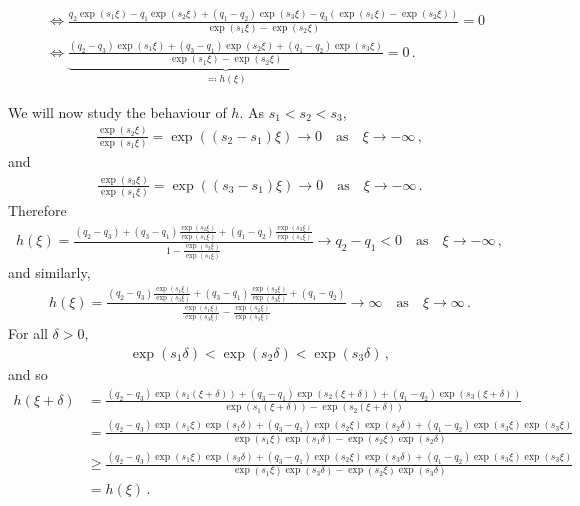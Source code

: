 %
\begin{align*}
&\iff \frac{q_2 \exp(s_1 \xi) - q_1 \exp(s_2 \xi) + (q_1 - q_2) \exp(s_3 \xi)
	- q_3 (\exp(s_1 \xi) - \exp(s_2 \xi))}{\exp(s_1 \xi) - \exp(s_2 \xi)}=0\\
&\iff \underbrace{\frac{(q_2 - q_3) \exp(s_1 \xi) + (q_3 - q_1) \exp(s_2 \xi)
		+ (q_1 - q_2) \exp(s_3 \xi)}{\exp(s_1 \xi) - \exp(s_2 \xi)}}
_{\eqqcolon h(\xi)} = 0 \,.
\end{align*}
%

%
We will now study the behaviour of $h$.
As $s_1 < s_2 < s_3$,
%
\begin{align*}
\frac{\exp(s_2 \xi)}{\exp(s_1 \xi)} = \exp((s_2 - s_1) \xi) \to 0
\quad \text{as} \quad \xi \to -\infty \,,
\end{align*}
%
and
%
\begin{align*}
\frac{\exp(s_3 \xi)}{\exp(s_1 \xi)} = \exp((s_3 - s_1) \xi) \to 0
\quad \text{as} \quad \xi \to -\infty \,.
\end{align*}
%
Therefore
%
\begin{align*}
h(\xi) = \frac{(q_2 - q_3) + (q_3 - q_1)
	\frac{\exp(s_2 \xi)}{\exp(s_1 \xi)}
	+ (q_1 - q_2)\frac{\exp(s_3 \xi)}{\exp(s_1 \xi)}}
{1 - \frac{\exp(s_2 \xi)}{\exp(s_1 \xi)}} \to q_2 - q_1 < 0
\quad \text{as} \quad \xi \to - \infty \,,
\end{align*}
%
and similarly,
%
\begin{align*}
h(\xi)= \frac{(q_2 - q_3)\frac{\exp(s_1 \xi)}{\exp(s_3 \xi)}
	+ (q_3 - q_1) \frac{\exp(s_2 \xi)}{\exp(s_3 \xi)} + (q_1 - q_2)}
{\frac{\exp(s_1 \xi)}{\exp(s_3 \xi)} - \frac{\exp(s_2 \xi)}
	{\exp(s_3 \xi)}} \to \infty \quad \text{as} \quad \xi \to \infty \,.
\end{align*}
%
For all $\delta > 0$,
%
\begin{align*}
\exp(s_1 \delta) < \exp(s_2 \delta) < \exp(s_3 \delta) \,,
\end{align*}
%
and so
%
\begin{align*}
h(\xi + \delta) &= \frac{(q_2 - q_3) \exp(s_1 (\xi + \delta)) + (q_3 - q_1)
	\exp(s_2 (\xi + \delta)) + (q_1 - q_2) \exp(s_3 (\xi + \delta))}
{\exp(s_1 (\xi + \delta)) - \exp(s_2 (\xi + \delta))}\\
&= \frac{(q_2 - q_3) \exp(s_1 \xi) \exp(s_1 \delta)
	+ (q_3 - q_1) \exp(s_2 \xi) \exp(s_2 \delta)
	+ (q_1 - q_2) \exp(s_3 \xi) \exp(s_3 \xi)}
{\exp(s_1 \xi) \exp(s_1 \delta)
	- \exp(s_2 \xi) \exp(s_2 \delta)}\\
&\geq \frac{(q_2 - q_3) \exp(s_1 \xi) \exp(s_3 \delta)
	+ (q_3 - q_1) \exp(s_2 \xi) \exp(s_3 \delta)
	+ (q_1 - q_2) \exp(s_3 \xi) \exp(s_3 \xi)}
{\exp(s_1 \xi) \exp(s_3 \delta)
	- \exp(s_2 \xi) \exp(s_3 \delta)}\\
&= h(\xi) \,.
\end{align*}
